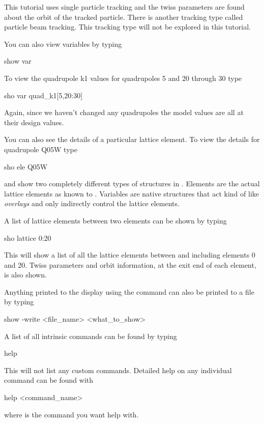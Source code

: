 This tutorial uses single particle tracking and the twiss parameters
are found about the orbit of the tracked particle. There is another
tracking type called particle beam tracking. This
tracking type will not be explored in this tutorial.

You can also view variables by typing
\begin{example}
  show var
\end{example}
To view the quadrupole k1 values for \cesr quadrupoles 5 and 20
through 30 type
\begin{example}
  sho var quad\_k1[5,20:30]
\end{example}
Again, since we haven't changed any quadrupoles the model values are
all at their design values.

You can also see the details of a particular lattice element. To view
the details for quadrupole Q05W type
\begin{example}
  sho ele Q05W
\end{example}

 and  show two completely different types of
structures in \tao. Elements are the actual lattice elements as known
to \bmad.  Variables are native \tao structures that act kind of like
\bmad \textit{overlays} and only indirectly control the lattice
elements.

A list of lattice elements between two elements can be shown by typing 
\begin{example}
  sho lattice 0:20
\end{example}
This will show a list of all the lattice elements between and
including elements 0 and 20. Twiss parameters and orbit information, at
the exit end of each element, is also shown.

Anything printed to the display using the  command can also
be printed to a file by typing
\begin{example}
  show -write <file_name> <what_to_show>
\end{example}

A list of all intrinsic  commands can be found by typing
\begin{example}
  help
\end{example}
This will not list any custom commands. Detailed help on any
individual command can be found with
\begin{example}
  help <command\_name>
\end{example}
where  is the command you want help with.
